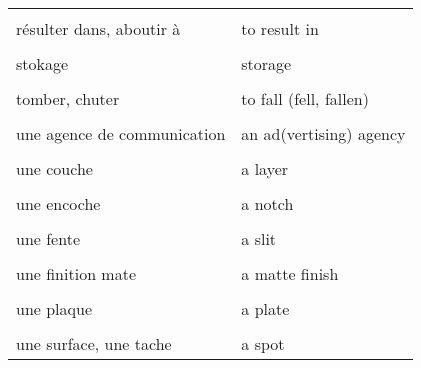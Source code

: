 \documentclass[
  10pt,
]{article}
\begin{document}
\begin{longtable}{ll}
\cellcolor{gray!6}{reliure à spirale} & \cellcolor{gray!6}{coil binding}\\

résulter dans, aboutir à & to result in\\

\cellcolor{gray!6}{sans} & \cellcolor{gray!6}{without}\\

stokage & storage\\

\cellcolor{gray!6}{taille} & \cellcolor{gray!6}{size}\\

tomber, chuter & to fall (fell, fallen)\\

\cellcolor{gray!6}{trade} & \cellcolor{gray!6}{commerce}\\

une agence de communication & an ad(vertising) agency\\

\cellcolor{gray!6}{une configuration} & \cellcolor{gray!6}{a setup}\\

une couche & a layer\\

\cellcolor{gray!6}{une couverture, un blanchet} & \cellcolor{gray!6}{a blanket}\\

une encoche & a notch\\

\cellcolor{gray!6}{une enveloppe} & \cellcolor{gray!6}{a wrap}\\

une fente & a slit\\

\cellcolor{gray!6}{une finition brillante} & \cellcolor{gray!6}{a glossy finish}\\

une finition mate & a matte finish\\

\cellcolor{gray!6}{une fois que} & \cellcolor{gray!6}{once}\\

une plaque & a plate\\

\cellcolor{gray!6}{une sous-couche} & \cellcolor{gray!6}{an under-coat}\\

une surface, une tache & a spot\\


\end{longtable}
\end{document}
